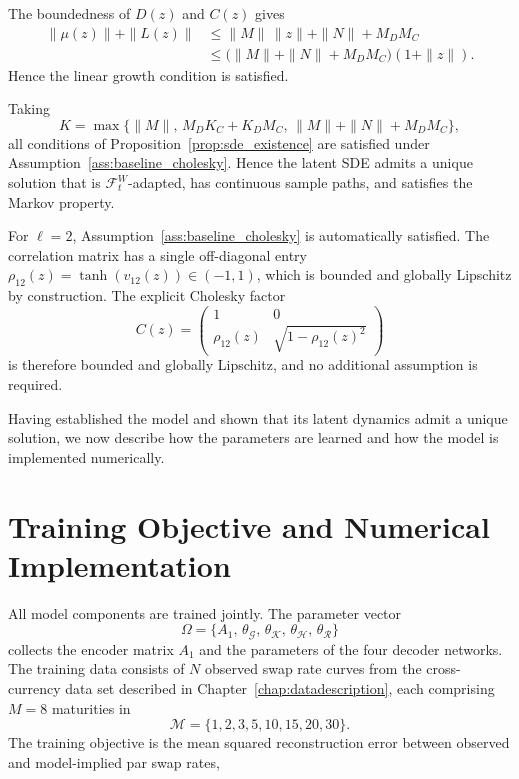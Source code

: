 \begin{description}[
    style=unboxed,
    leftmargin=0pt,
    labelindent=0pt,
    labelsep=0.5em
]
\item[Linear growth.]
The boundedness of $D(z)$ and $C(z)$ gives
\[
\begin{aligned}
\|\mu(z)\|+\|L(z)\|
&\leq
\|M\|\,\|z\|+\|N\|+M_DM_C \\
&\leq
\bigl(\|M\|+\|N\|+M_DM_C\bigr)(1+\|z\|).
\end{aligned}
\]
Hence the linear growth condition is satisfied.

\end{description}

Taking 
$$K=\max\{\|M\|,\,M_DK_C+K_DM_C,\,\|M\|+\|N\|+M_DM_C\},$$
all conditions of Proposition~\ref{prop:sde_existence} are satisfied under Assumption~\ref{ass:baseline_cholesky}. Hence the latent SDE admits a unique solution that is $\mathcal{F}_t^W$-adapted, has continuous sample paths, and satisfies the Markov property.

\begin{remark}
For $\ell=2$, Assumption~\ref{ass:baseline_cholesky} is automatically
satisfied. The correlation matrix has a single off-diagonal entry
$\rho_{12}(z)=\tanh(v_{12}(z))\in(-1,1)$, which is bounded and globally
Lipschitz by construction. The explicit Cholesky factor
\[
C(z)=
\begin{pmatrix}
1 & 0 \\
\rho_{12}(z) & \sqrt{1-\rho_{12}(z)^2}
\end{pmatrix}
\]
is therefore bounded and globally Lipschitz, and no additional assumption
is required.
\end{remark}

Having established the model and shown that its latent dynamics admit a unique solution, we now describe how the parameters are learned and how the model is implemented numerically.

\section{Training Objective and Numerical Implementation}
\label{sec:model_estimation_training_choices}

All model components are trained jointly. The parameter vector
\[
\Omega = \{A_1,\,\theta_{\mathcal{G}},\,\theta_{\mathcal{K}},\,\theta_{\mathcal{H}},\,\theta_{\mathcal{R}}\}
\]
collects the encoder matrix $A_1$ and the parameters of the four decoder networks. The training data consists of $N$ observed swap rate curves from the cross-currency data set described in Chapter~\ref{chap:datadescription}, each comprising $M=8$ maturities in
$$\mathcal{M}=\{1,2,3,5,10,15,20,30\}.$$
The training objective is the mean squared reconstruction error between observed and model-implied par swap rates,

